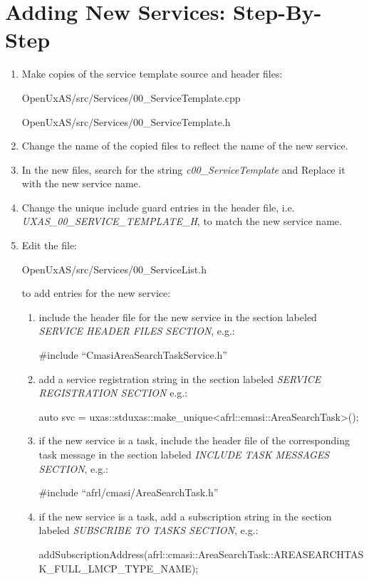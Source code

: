 \section{Adding New Services:
Step-By-Step}\label{adding-new-services-step-by-step}

\begin{enumerate}
\def\labelenumi{\arabic{enumi}.}
\item
  Make copies of the service template source and header files:

  OpenUxAS/src/Services/00\_ServiceTemplate.cpp

  OpenUxAS/src/Services/00\_ServiceTemplate.h
\item
  Change the name of the copied files to reflect the name of the new
  service.
\item
  In the new files, search for the string \emph{c00\_ServiceTemplate}
  and Replace it with the new service name.
\item
  Change the unique include guard entries in the header file, i.e.
  \emph{UXAS\_00\_SERVICE\_TEMPLATE\_H}, to match the new service name.
\item
  Edit the file:

  OpenUxAS/src/Services/00\_ServiceList.h

  to add entries for the new service:

  \begin{enumerate}
  \def\labelenumii{\arabic{enumii}.}
  \item
    include the header file for the new service in the section labeled
    \emph{SERVICE HEADER FILES SECTION}, e.g.:

    \#include ``CmasiAreaSearchTaskService.h''
  \item
    add a service registration string in the section labeled
    \emph{SERVICE REGISTRATION SECTION} e.g.:

    {auto svc =
    uxas::stduxas::make\_unique\textless{}afrl::cmasi::AreaSearchTask\textgreater{}();}
  \item
    if the new service is a task, include the header file of the
    corresponding task message in the section labeled \emph{INCLUDE TASK
    MESSAGES SECTION}, e.g.:

    \#include ``afrl/cmasi/AreaSearchTask.h''
  \item
    if the new service is a task, add a subscription string in the
    section labeled \emph{SUBSCRIBE TO TASKS SECTION}, e.g.:

    addSubscriptionAddress(afrl::cmasi::AreaSearchTask::AREASEARCHTASK\_FULL\_LMCP\_TYPE\_NAME);
  \end{enumerate}
\end{enumerate}


